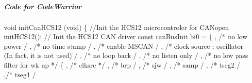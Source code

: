 \documentclass[a4paper,12pt]{book}
\newcommand{\canopen}{CANopen}
\begin{document}
\subparagraph{Code for CodeWarrior}
{\ttfamily
void initCanHCS12 (void)\newline
 \{ \space \newline
  \space //Init the HCS12 microcontroler for \canopen{} \newline
  \space initHCS12();\newline
  \space \space // Init the HCS12 \space CAN driver\newline
  \space const canBusInit bi0 = \{\newline
  \space \space {}, \space \space \space /* no low power \space \space \space \space \space \space \space \space \space \space \space \space \space \space \space \space */
\newline
  \space \space {}, \space \space \space /* no time stamp
\space \space \space \space \space \space \space \space \space \space \space \space \space \space \space */\newline
  \space \space {}, \space \space \space /* enable MSCAN
\space \space \space \space \space \space \space \space \space \space \space \space \space \space \space \space */\newline
  \space \space {}, \space \space \space /* clock source : oscillator (In fact, it is not used)
\space \space */\newline
  \space \space {}, \space \space \space /* no loop back
\space \space \space \space \space \space \space \space \space \space \space \space \space \space \space \space */\newline
  \space \space {}, \space \space \space /* no listen only
\space \space \space \space \space \space \space \space \space \space \space \space \space \space */\newline
  \space \space {}, \space \space \space /* no low pass filter for wk up */\newline
  \space \space \space \{\newline
  \space \space \space {}, /* clksrc */\newline
  \space \space \space {}, /* brp \space \space \space */\newline
  \space \space \space {}, /* sjw \space \space \space */\newline
  \space \space \space {}, /* samp \space \space */\newline
  \space \space \space {}, /* tseg2 \space */\newline
  \space \space \space {},/* tseg1 \space */\newline
}
\end{document}
